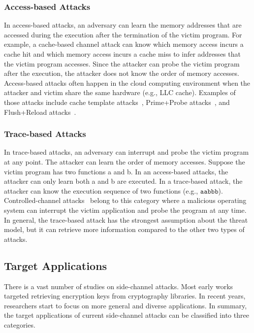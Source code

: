 \subsubsection*{Access-based Attacks}
In access-based attacks, an adversary can learn the memory addresses that are accessed during the execution after the termination of the victim program. 
For example, a cache-based channel attack can know which memory access incurs a cache hit and which memory access incurs a cache miss to infer addresses that the victim program accesses. Since the attacker can probe the victim program after the execution, the attacker does not know the order of memory accesses. Access-based attacks often happen in the cloud computing environment when the attacker and victim share the same hardware (e.g., LLC cache). Examples of those attacks include cache template attacks~\cite{191010}, Prime+Probe attacks~\cite{liu2015last}, and Flush+Reload attacks~\cite{yarom2014flush+}.
\subsubsection*{Trace-based Attacks}
In trace-based attacks, an adversary can interrupt and  probe the victim program at any point. The attacker can learn the order of memory accesses. Suppose the victim program has two functions \textsf{a} and \textsf{b}. In an access-based attacks, the attacker can only learn both \textsf{a} and \textsf{b} are executed. In a trace-based attack, the attacker can know the execution sequence of two functions (e.g., $\mathtt{aabbb}$). Controlled-channel attacks~\cite{moghimi2020copycat, xu2015controlled} belong to this category where a malicious operating system can interrupt the victim application and probe the program at any time. In general, the trace-based attack has the strongest assumption about the threat model,  but it can retrieve more information compared to the other two types of attacks.
\subsection{Target Applications}
There is a vast number of studies\cite{yarom2017cachebleed,191010,184415,Osvik2006,liu2015last} on side-channel attacks. Most early works targeted retrieving encryption keys from cryptography libraries. In recent years, researchers start to focus on more general and diverse applications. In summary,  the target applications of current side-channel attacks can be classified into three categories.

